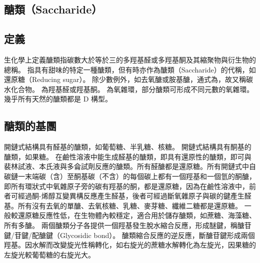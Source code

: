 \documentclass[a4paper,12pt]{report}
\begin{document}
\begin{itemize}
\section{醣類（Saccharide）}
\subsection{定義}
生化學上定義醣類指碳數大於等於三的多羥基醛或多羥基酮及其縮聚物與衍生物的總稱。
指具有甜味的特定一種醣類，但有時亦作為醣類（Saccharide）的代稱，如還原糖（Reducing sugar）。
除少數例外，如去氧醣或胺基醣，通式為，故又稱碳水化合物。
為羥基醛或羥基酮。
為氧雜環，部分醣類可形成不同元數的氧雜環。
幾乎所有天然的醣類都是 D 構型。
\subsection{醣類的基團}
開鏈式結構具有醛基的醣類，如葡萄糖、半乳糖、核糖。
開鏈式結構具有酮基的醣類，如果糖。
在鹼性溶液中能生成醛基的醣類，即具有還原性的醣類，即可與裴林試液、本氏液與多侖試劑反應的醣類。所有醛醣都是還原糖。所有開鏈式中自碳鏈一末端碳（含）至酮基碳（不含）的每個碳上都有一個羥基和一個氫的酮醣，即所有環狀式中氧雜原子旁的碳有羥基的酮，都是還原糖，因為在鹼性溶液中，前者可經過酮-烯醇互變異構反應產生醛基，後者可經過斷氧雜原子與碳的鍵產生醛基。所有沒有去氧的單醣、去氧核糖、乳糖、麥芽糖、纖維二糖都是還原糖。
一般較還原糖反應性低，在生物體內較穩定，適合用於儲存醣類，如蔗糖、海藻糖、所有多醣。
兩個醣類分子各提供一個羥基發生脫水縮合反應，形成醚鍵，稱醣苷鍵/苷鍵/配醣鍵（Glycosidic bond）。
醣類縮合反應的逆反應，斷醣苷鍵形成兩個羥基。因水解而改變旋光性稱轉化，如右旋光的蔗糖水解轉化為左旋光，因果糖的左旋光較葡萄糖的右旋光大。

\end{itemize}
\end{document}
